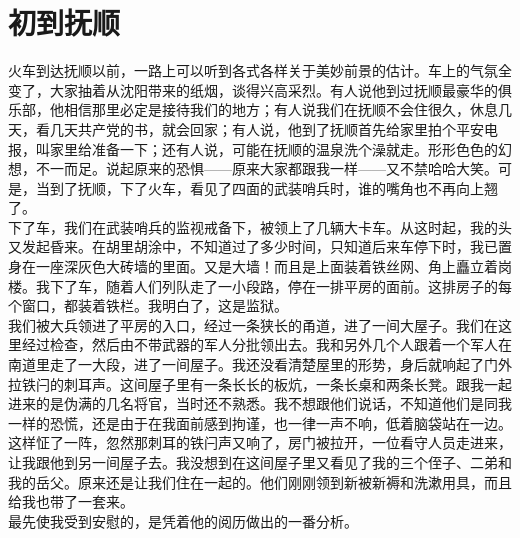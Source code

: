 \fancyhead[RO]{\thepage} %
\fancyhead[LE]{\thepage} %
\chapter*{初到抚顺}
火车到达抚顺以前，一路上可以听到各式各样关于美妙前景的估计。车上的气氛全变了，大家抽着从沈阳带来的纸烟，谈得兴高采烈。有人说他到过抚顺最豪华的俱乐部，他相信那里必定是接待我们的地方；有人说我们在抚顺不会住很久，休息几天，看几天共产党的书，就会回家；有人说，他到了抚顺首先给家里拍个平安电报，叫家里给准备一下；还有人说，可能在抚顺的温泉洗个澡就走。形形色色的幻想，不一而足。说起原来的恐惧——原来大家都跟我一样——又不禁哈哈大笑。可是，当到了抚顺，下了火车，看见了四面的武装哨兵时，谁的嘴角也不再向上翘了。\\

下了车，我们在武装哨兵的监视戒备下，被领上了几辆大卡车。从这时起，我的头又发起昏来。在胡里胡涂中，不知道过了多少时间，只知道后来车停下时，我已置身在一座深灰色大砖墙的里面。又是大墙！而且是上面装着铁丝网、角上矗立着岗楼。我下了车，随着人们列队走了一小段路，停在一排平房的面前。这排房子的每个窗口，都装着铁栏。我明白了，这是监狱。\\

我们被大兵领进了平房的入口，经过一条狭长的甬道，进了一间大屋子。我们在这里经过检查，然后由不带武器的军人分批领出去。我和另外几个人跟着一个军人在南道里走了一大段，进了一间屋子。我还没看清楚屋里的形势，身后就响起了门外拉铁闩的刺耳声。这间屋子里有一条长长的板炕，一条长桌和两条长凳。跟我一起进来的是伪满的几名将官，当时还不熟悉。我不想跟他们说话，不知道他们是同我一样的恐慌，还是由于在我面前感到拘谨，也一律一声不响，低着脑袋站在一边。这样怔了一阵，忽然那刺耳的铁闩声又响了，房门被拉开，一位看守人员走进来，让我跟他到另一间屋子去。我没想到在这间屋子里又看见了我的三个侄子、二弟和我的岳父。原来还是让我们住在一起的。他们刚刚领到新被新褥和洗漱用具，而且给我也带了一套来。\\

最先使我受到安慰的，是凭着他的阅历做出的一番分析。\\

